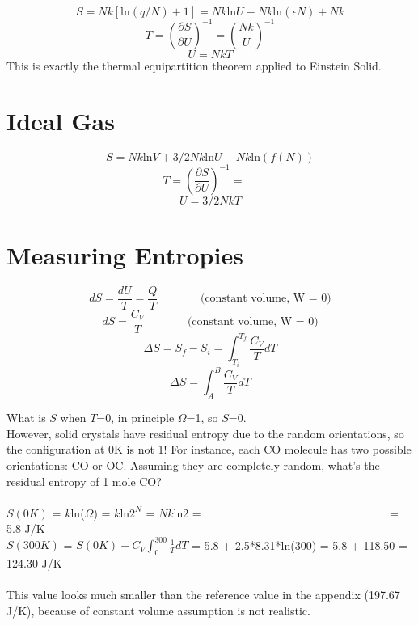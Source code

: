 \documentclass[twoside]{article}
\begin{document}
\begin{equation} S = Nk[\text{ln}(q/N)+1] = Nk\text{ln}U - Nk\text{ln}(\epsilon N) + Nk \end{equation}
\begin{equation} T = (\frac {\partial{S}} {\partial{U}})^{-1} = (\frac{Nk}{U})^{-1}\end{equation}
\begin{equation} U = NkT \end{equation}
This is exactly the thermal equipartition theorem applied to Einstein Solid.

\section{Ideal Gas}

\begin{equation} S = Nk\text{ln}V + 3/2Nk\text{ln}U - Nk\text{ln}(f(N)) \end{equation}
\begin{equation} T = (\frac {\partial{S}} {\partial{U}}) ^{-1} = ~~~~~\end{equation}
\begin{equation} U = 3/2NkT \end{equation}


\section{Measuring Entropies}
\begin{equation} dS = \frac{dU}{T} = \frac{Q}{T}   ~~~~~~~~~~~~~~~~~ \text{(constant volume, W = 0)}\end{equation}
\begin{equation} dS = \frac{C_V}{T}   ~~~~~~~~~~~~~~~~~ \text{(constant volume, W = 0)}\end{equation}
\begin{equation} \Delta{S} = S_f-S_i = \int^{T_f}_{T_i} \frac{C_V}{T} dT \end{equation}
\begin{equation} \Delta{S} = \int^B_A \frac{C_V}{T} dT \end{equation}

What is $S$ when $T$=0, in principle $\Omega$=1, so $S$=0.\\
However, solid crystals have residual entropy due to the random orientations, so the configuration at 0K is not 1!
For instance, each CO molecule has two possible orientations: CO or OC. Assuming they are completely random, what's the residual entropy of 1 mole CO?\\\\
$S(0K)$ = $k$ln($\Omega$) = $k$ln$2^N$ = $Nk$ln2 = ~~~~~~~~~~~~~~~~~~~~~~~~~~~~~~~~ = 5.8 J/K\\
$S(300K)$ = $S(0K) + C_V \int^{300}_{0} \frac{1}{T} dT$ = 5.8 + 2.5*8.31*ln(300) = 5.8 + 118.50 = 124.30 J/K\\\\
This value looks much smaller than the reference value in the appendix (197.67 J/K), because of constant volume assumption is not realistic.
\end{document}
